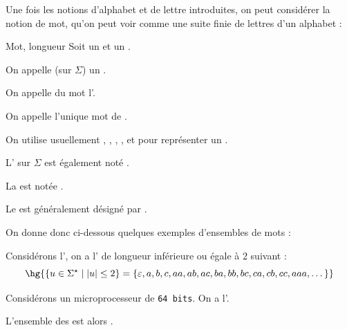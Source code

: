     Une fois les notions d'alphabet et de lettre introduites, on peut considérer la notion de mot, qu'on peut voir comme une suite finie de lettres d'un alphabet :
    
    \begin{definition}{Mot, longueur}{}
        Soit \hg{$\Sigma$} un  et  un .
        \begin{enumerate}
            \itast On appelle  (sur $\Sigma$) un .
            
            \itast On appelle  du mot  l'.
            
            \itast On appelle  l'unique mot  de .
        \end{enumerate}
    \end{definition}
    
    \begin{notation}
        \begin{enumerate}
            \itt On utilise usuellement , , , ,  et  pour représenter un .
            
            \itt L' sur $\Sigma$ est également noté \hg{$\Sigma^\star$}.
            
            \itt La  est notée .
            
            \itast Le  est généralement désigné par \hg{$\epsilon$}.
        \end{enumerate}
    \end{notation}
    
    On donne donc ci-dessous quelques exemples d'ensembles de mots :
    \begin{example}{}{}
        \begin{enumerate}
            \itt Considérons l', on a l' de longueur inférieure ou égale à $2$ suivant :
            \[ \hg{\ens{u \in \Sigma^\star \enstq \mod{u} \leq 2} = \ens{\epsilon, a, b, c, aa, ab, ac, ba, bb, bc, ca, cb, cc, aaa, \dots}} \]
            
            \itt Considérons un microprocesseur de \texttt{64 bits}. On a l'.
            
            L'ensemble des  est alors . 
        \end{enumerate}
    \end{example}
    
